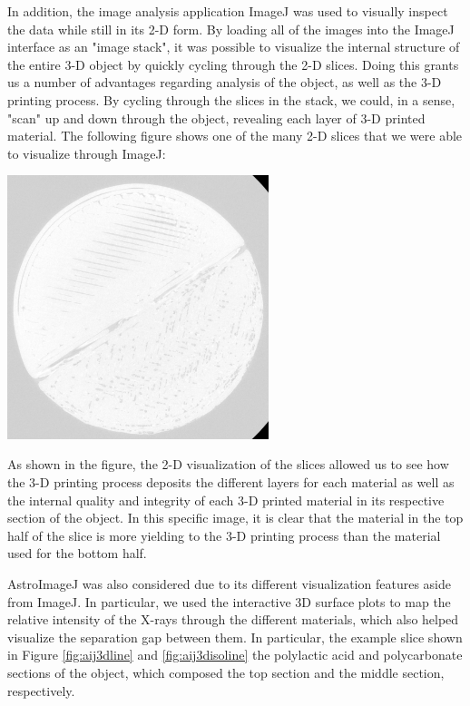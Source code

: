 \documentclass[11pt, letterpaper, notitlepage]{article}
\newenvironment{Figure}
  {\par\medskip\noindent\minipage{\linewidth}}
  {\endminipage\par\medskip}
\begin{document}
\begin{multicols}{2}
In addition, the image analysis application ImageJ was used to visually inspect the data while still in its 2-D form.  By loading all of the images into the ImageJ interface as an "image stack", it was possible to visualize the internal structure of the entire 3-D object by quickly cycling through the 2-D slices. Doing this grants us a number of advantages regarding analysis of the object, as well as the 3-D printing process.  By cycling through the slices in the stack, we could, in a sense, "scan" up and down through the object, revealing each layer of 3-D printed material. The following figure shows one of the many 2-D slices that we were able to visualize through ImageJ:
\begin{Figure}
  \centering
  \includegraphics[width=3in]{images/CTscan.png}
  \label{fig:imj2d}
\end{Figure}

As shown in the figure, the 2-D visualization of the slices allowed us to see how the 3-D printing process deposits the different layers for each material as well as the internal quality and integrity of each 3-D printed material in its respective section of the object. In this specific image, it is clear that the material in the top half of the slice is more yielding to the 3-D printing process than the material used for the bottom half.

AstroImageJ was also considered due to its different visualization features aside from ImageJ. In particular, we used the interactive 3D surface plots to map the relative intensity of the X-rays through the different materials, which also helped visualize the separation gap between them. In particular, the example slice shown in Figure \ref{fig:aij3dline} and \ref{fig:aij3disoline} the polylactic acid and polycarbonate sections of the object, which composed the top section and the middle section, respectively.


\end{multicols}
\end{document}

